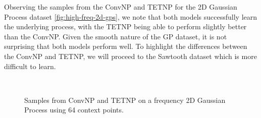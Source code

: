 \documentclass[../../main.tex]{subfiles}
\begin{document}
Observing the samples from the ConvNP and TETNP for the 2D Gaussian Process dataset \autoref{fig:high-freq-2d-gps}, we note that both models successfully  learn the underlying process, with the TETNP being able to perform slightly better than the ConvNP. Given the smooth nature of the GP dataset, it is not surprising that both models perform well. To highlight the differences between the ConvNP and TETNP, we will proceed to the Sawtooth dataset which is more difficult to learn.


\begin{figure}[H]
	\centering
	\\
	\caption{Samples from ConvNP and TETNP on a frequency 2D Gaussian Process using 64 context points.}
	\label{fig:high-freq-2d-gps}
\end{figure}
\end{document}
